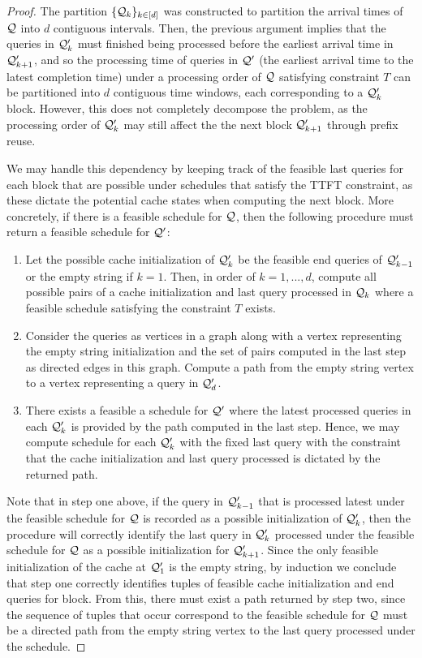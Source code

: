 \begin{proof}
    The partition $\{\mathcal{Q}_k\}_{k \in [d]}$ was constructed to partition the arrival times of $\mathcal{Q}$ into $d$ contiguous intervals. Then, the previous argument implies that the queries in $\mathcal{Q}_k'$ must finished being processed before the earliest arrival time in $\mathcal{Q}_{k+1}'$, and so the processing time of queries in $\mathcal{Q}'$ (the earliest arrival time to the latest completion time) under a processing order of $\mathcal{Q}$ satisfying constraint $T$ can be partitioned into $d$ contiguous time windows, each corresponding to a $\mathcal{Q}_k'$ block. However, this does not completely decompose the problem, as the processing order of $\mathcal{Q}_k'$ may still affect the the next block $\mathcal{Q}_{k+1}'$ through prefix reuse.

    We may handle this dependency by keeping track of the feasible last queries for each block that are possible under schedules that satisfy the TTFT constraint, as these dictate the potential cache states when computing the next block. More concretely, if there is a feasible schedule for $\mathcal{Q}$, then the following procedure must return a feasible schedule for $\mathcal{Q}'$:
    \begin{enumerate}
        \item Let the possible cache initialization of $\mathcal{Q}_k'$ be the feasible end queries of $\mathcal{Q}_{k-1}'$ or the empty string if $k=1$. Then, in order of $k=1,...,d$, compute all possible pairs of a cache initialization and last query processed in $\mathcal{Q}_k$ where a feasible schedule satisfying the constraint $T$ exists.
        \item Consider the queries as vertices in a graph along with a vertex representing the empty string initialization and the set of pairs computed in the last step as directed edges in this graph. Compute a path from the empty string vertex to a vertex representing a query in $\mathcal{Q}_d'$.
        \item There exists a feasible a schedule for $\mathcal{Q}'$ where the latest processed queries in each $\mathcal{Q}_k'$ is provided by the path computed in the last step. Hence, we may compute schedule for each $\mathcal{Q}_k'$ with the fixed last query with the constraint that the cache initialization and last query processed is dictated by the returned path.
    \end{enumerate}
    Note that in step one above, if the query in $\mathcal{Q}_{k-1}'$ that is processed latest under the feasible schedule for $\mathcal{Q}$ is recorded as a possible initialization of $\mathcal{Q}_k'$, then the procedure will correctly identify the last query in $\mathcal{Q}_k'$ processed under the feasible schedule for $\mathcal{Q}$ as a possible initialization for $\mathcal{Q}_{k+1}'$. Since the only feasible initialization of the cache at $\mathcal{Q}_1'$ is the empty string, by induction we conclude that step one correctly identifies tuples of feasible cache initialization and end queries for block. From this, there must exist a path returned by step two, since the sequence of tuples that occur correspond to the feasible schedule for $\mathcal{Q}$ must be a directed path from the empty string vertex to the last query processed under the schedule.


\end{proof}
